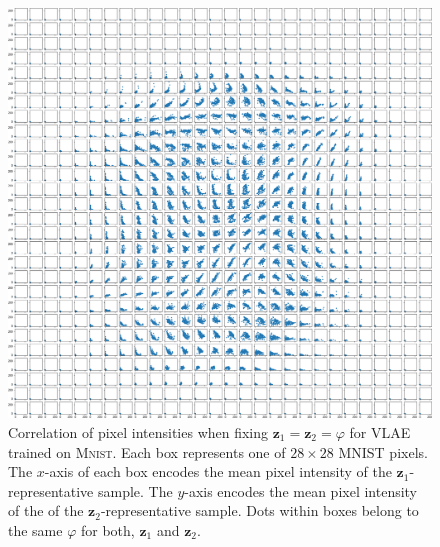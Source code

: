 \begin{figure}
    \centering
    \includegraphics[width=\textwidth]{images/notprop/mnist/vlae/ccs_0_1_vlae.png}
    \caption[\ac{VLAE} on \textsc{Mnist} - Pixel intensity correlation]{Correlation of pixel intensities when fixing $\bm{z}_1 = \bm{z}_2=\varphi$ for \ac{VLAE} trained on \textsc{Mnist}. Each box represents one of $28\times 28$ MNIST pixels. The $x$-axis of each box encodes the mean pixel intensity of the $\bm{z}_1$-representative sample. The $y$-axis encodes the mean pixel intensity of the of the $\bm{z}_2$-representative sample. Dots within boxes belong to the same $\varphi$ for both, $\bm{z}_1$ and $\bm{z}_2$. }
    \label{fig:notprop}
\end{figure}

